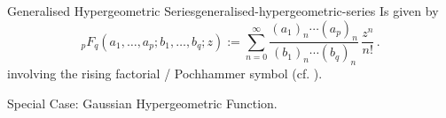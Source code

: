 \begin{definition}{Generalised Hypergeometric Series}{generalised-hypergeometric-series}
  Is given by
  $${}_{p}F_{q}(a_{1},\ldots ,a_{p};b_{1},\ldots ,b_{q};z) := \sum _{n=0}^{\infty }{\frac {(a_{1})_{n}\cdots (a_{p})_{n}}{(b_{1})_{n}\cdots (b_{q})_{n}}}\,{\frac {z^{n}}{n!}}\,.$$
  involving the rising factorial / Pochhammer symbol (cf. ).
\end{definition}

Special Case: Gaussian Hypergeometric Function.
